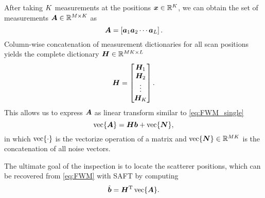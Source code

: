 After taking $K$ measurements at the positions $\bm{x} \in {\mathbb{R}}^{K}$, we can obtain the set of measurements $\bm{A} \in {\mathbb{R}}^{M \times K}$ as 
\begin{equation} \label{eq:bscan}
	\Ascan = \left[ \ascan{1} \ascan{2}  \cdots \ascan{\LL} \right].
\end{equation}
Column-wise concatenation of measurement dictionaries for all scan positions yields the complete dictionary $\bm{H} \in {\mathbb{R}}^{M K \times L}$
\begin{equation} \label{eq:SAFTdef}
	\SAFT = \begin{bmatrix} \SAFT_1 \\ \SAFT_2 \\ \vdots \\ \SAFT_{\K} \end{bmatrix}.
\end{equation}
This allows us to express $\bm{A}$ as linear transform similar to \eqref{eq:FWM_single} 
\begin{equation} \label{eq:FWM}
	\vectorize{ \Ascan} = \SAFT \defect + \vectorize { \bm{N} },
\end{equation}
in which $\operatorname{vec} \{  \cdot  \}$ is the vectorize operation of a matrix and $\operatorname{vec} \{  \bm{N}  \} \in {\mathbb{R}}^{M K}$ is the concatenation of all noise vectors.\par

The ultimate goal of the inspection is to locate the scatterer positions, which can be recovered from \eqref{eq:FWM} with SAFT by computing
\begin{equation} \label{eq:reco}
	\defecthat = \SAFT^{\T} \vectorize{ \Ascan}.
\end{equation}